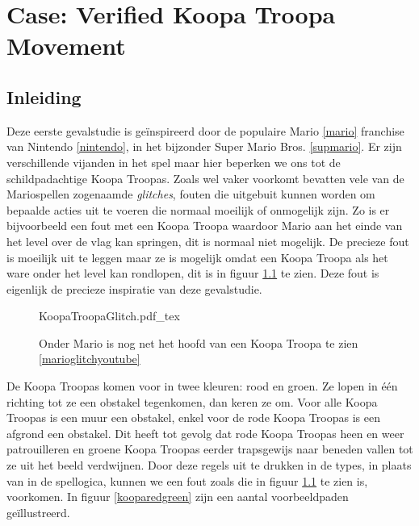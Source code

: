 \chapter{Case: Verified Koopa Troopa Movement}
\label{ch:case-koopa}


\section{Inleiding}

Deze eerste gevalstudie is geïnspireerd door de populaire Mario \ref{mario}
franchise van Nintendo \ref{nintendo}, in het bijzonder Super Mario Bros.
\ref{supmario}. Er zijn verschillende vijanden in het spel maar hier beperken
we ons tot de schildpadachtige Koopa Troopas. Zoals wel vaker voorkomt bevatten
vele van de Mariospellen zogenaamde \emph{glitches}, fouten die uitgebuit
kunnen worden om bepaalde acties uit te voeren die normaal moeilijk of
onmogelijk zijn. Zo is er bijvoorbeeld een fout met een Koopa Troopa waardoor
Mario aan het einde van het level over de vlag kan springen, dit is normaal
niet mogelijk. De precieze fout is moeilijk uit te leggen maar ze is mogelijk
omdat een Koopa Troopa als het ware onder het level kan rondlopen, dit is in
figuur \ref{koopaglitch} te zien. Deze fout is eigenlijk de precieze inspiratie
van deze gevalstudie.

\begin{figure}
  \centering
  \def\svgwidth{\textwidth}
  {KoopaTroopaGlitch.pdf\string_tex}
  \caption{Onder Mario is nog net het hoofd van een Koopa Troopa te zien
           \ref{marioglitchyoutube}}
  \label{koopaglitch}
\end{figure}

De Koopa Troopas komen voor in twee kleuren: rood en groen. Ze lopen in één
richting tot ze een obstakel tegenkomen, dan keren ze om. Voor alle Koopa
Troopas is een muur een obstakel, enkel voor de rode Koopa Troopas is een
afgrond een obstakel. Dit heeft tot gevolg dat rode Koopa Troopas heen en weer
patrouilleren en groene Koopa Troopas eerder trapsgewijs naar beneden vallen
tot ze uit het beeld verdwijnen. Door deze regels uit te drukken in de types,
in plaats van in de spellogica, kunnen we een fout zoals die in figuur
\ref{koopaglitch} te zien is, voorkomen. In figuur \ref{kooparedgreen} zijn een
aantal voorbeeldpaden geïllustreerd.

